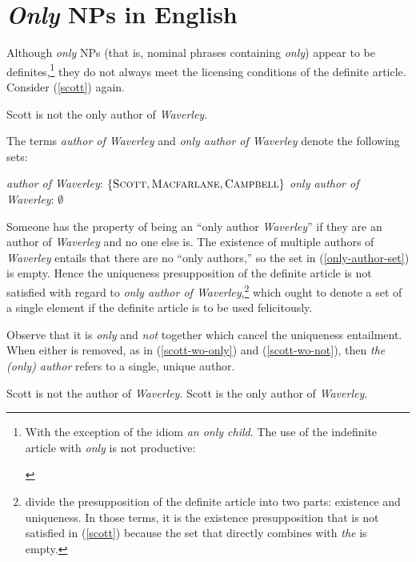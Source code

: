\section{\textit{Only} NPs in English \label{sec:only-nps-english}}
Although \textit{only} NPs (that is, nominal phrases containing \textit{only}) appear to be definites,\footnote{With the exception of the idiom \textit{an only child}. The use of the indefinite article with \textit{only} is not productive: \begin{exe}  \end{exe}} they do not always meet the licensing conditions of the definite article. Consider (\ref{scott}) again.

\begin{exe}
	 Scott is not the only author of \textit{Waverley}.
\end{exe}

The terms \textit{author of Waverley} and \textit{only author of Waverley} denote the following sets:

\begin{exe}
	\ex \textit{author of Waverley}: $\lbrace \textsc{Scott}, \textsc{Macfarlane}, \textsc{Campbell} \rbrace$
	\ex \label{only-author-set} \textit{only author of Waverley}: $\emptyset$
\end{exe}

Someone has the property of being an ``only author \textit{Waverley}'' if they are an author of \textit{Waverley} and no one else is. The existence of multiple authors of \textit{Waverley} entails that there are no ``only authors,'' so the set in (\ref{only-author-set}) is empty. Hence the uniqueness presupposition of the definite article is not satisfied with regard to \textit{only author of Waverley},\footnote{\citet{cb2015} divide the presupposition of the definite article into two parts: existence and uniqueness. In those terms, it is the existence presupposition that is not satisfied in (\ref{scott}) because the set that directly combines with \textit{the} is empty.} which ought to denote a set of a single element if the definite article is to be used felicitously.

Observe that it is \textit{only} and \textit{not} together which cancel the uniqueness entailment. When either is removed, as in (\ref{scott-wo-only}) and (\ref{scott-wo-not}), then \textit{the (only) author} refers to a single, unique author.

\begin{exe}
	\ex \label{scott-wo-only} Scott is not the author of \textit{Waverley}.
	\ex \label{scott-wo-not} Scott is the only author of \textit{Waverley}.
\end{exe}

